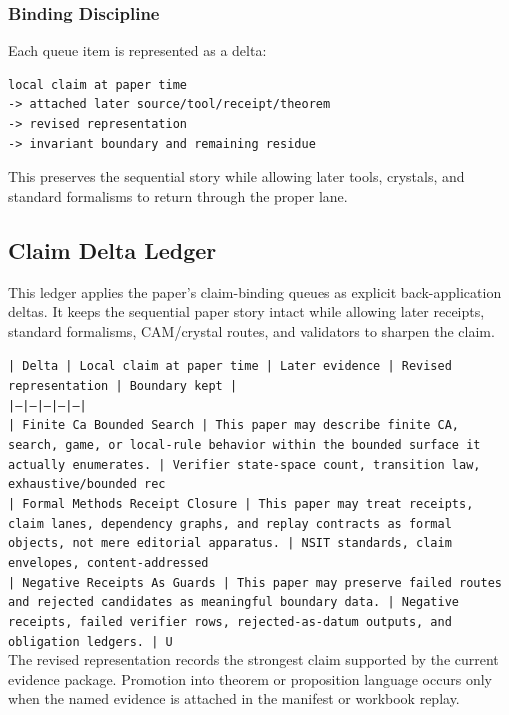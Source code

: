 \documentclass[11pt]{article}
\begin{document}
\subsubsection*{Binding Discipline}

Each queue item is represented as a delta:

\begin{verbatim}
local claim at paper time
-> attached later source/tool/receipt/theorem
-> revised representation
-> invariant boundary and remaining residue
\end{verbatim}

This preserves the sequential story while allowing later tools, crystals, and
standard formalisms to return through the proper lane.

\subsection*{Claim Delta Ledger}

This ledger applies the paper's claim-binding queues as explicit back-application
deltas. It keeps the sequential paper story intact while allowing later
receipts, standard formalisms, CAM/crystal routes, and validators to sharpen the
claim.

\noindent\texttt{| Delta | Local claim at paper time | Later evidence | Revised representation | Boundary kept |}\\
\noindent\texttt{|---|---|---|---|---|}\\
\noindent\texttt{| Finite Ca Bounded Search | This paper may describe finite CA, search, game, or local-rule behavior within the bounded surface it actually enumerates. | Verifier state-space count, transition law, exhaustive/bounded rec}\\
\noindent\texttt{| Formal Methods Receipt Closure | This paper may treat receipts, claim lanes, dependency graphs, and replay contracts as formal objects, not mere editorial apparatus. | NSIT standards, claim envelopes, content-addressed}\\
\noindent\texttt{| Negative Receipts As Guards | This paper may preserve failed routes and rejected candidates as meaningful boundary data. | Negative receipts, failed verifier rows, rejected-as-datum outputs, and obligation ledgers. | U}\\

The revised representation records the strongest claim supported by the current evidence package. Promotion into theorem or proposition language occurs only when the named evidence is attached in the manifest or workbook replay.
\end{document}
